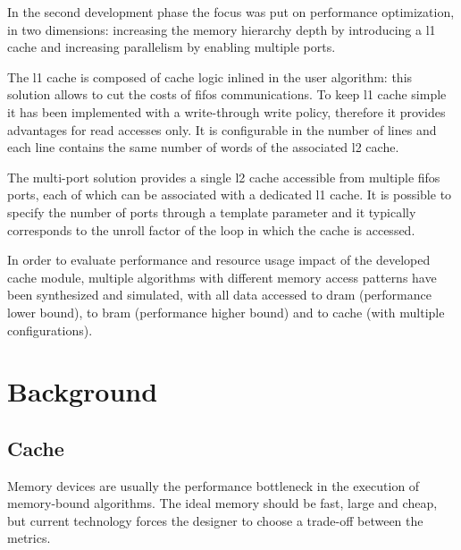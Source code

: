 \documentclass[11pt,a4paper,oneside]{memoir}
\begin{document}
\bigskip
In the second development phase the focus was put on performance optimization,
in two dimensions: increasing the memory hierarchy depth by introducing a
\ac{l1} cache and increasing parallelism by enabling multiple ports.

The \ac{l1} cache is composed of cache logic inlined in the user algorithm: this
solution allows to cut the costs of \acp{fifo} communications. To keep \ac{l1}
cache simple it has been implemented with a write-through write policy,
therefore it provides advantages for read accesses only. It is configurable in
the number of lines and each line contains the same number of words of the
associated \ac{l2} cache.

The multi-port solution provides a single \ac{l2} cache accessible from multiple
\acp{fifo} ports, each of which can be associated with a dedicated \ac{l1}
cache.
It is possible to specify the number of ports through a template parameter and
it typically corresponds to the unroll factor of the loop in which the cache
is accessed.

\bigskip
In order to evaluate performance and resource usage impact of the developed
cache module, multiple algorithms with different memory access patterns have
been synthesized and simulated, with all data accessed to \ac{dram} (performance
lower bound), to \ac{bram} (performance higher bound) and to cache (with
multiple configurations).

\vfill
\pagebreak

\tableofcontents*
\vfill
\pagebreak

\listoffigures
\vfill
\pagebreak

\listoftables
\vfill
\pagebreak

\printacronyms[heading=chapter,name={List of Acronyms}]
\vfill
\pagebreak

\clearpage
\pagestyle{centerruled}

\mainmatter
\chapter{Background}
\section{Cache}
Memory devices are usually the performance bottleneck in the execution of
memory-bound algorithms.
The ideal memory should be fast, large and cheap, but current technology forces
the designer to choose a trade-off between the metrics.
\end{document}
